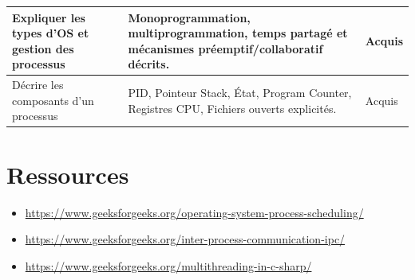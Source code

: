 \begin{center}
\begin{tabular}{|p{}|p{}|m{}|}
Expliquer les types d'OS et gestion des processus &
Monoprogrammation, multiprogrammation, temps partagé et mécanismes préemptif/collaboratif décrits. &
{\color{green!60!black}Acquis} \\ \hline

Décrire les composants d'un processus &
PID, Pointeur Stack, État, Program Counter, Registres CPU, Fichiers ouverts explicités. &
{\color{green!60!black}Acquis} \\ \hline

\end{tabular}
\end{center}

\section*{Ressources}

\begin{itemize}
	\item \url{https://www.geeksforgeeks.org/operating-system-process-scheduling/}
	\item \url{https://www.geeksforgeeks.org/inter-process-communication-ipc/}
	\item \url{https://www.geeksforgeeks.org/multithreading-in-c-sharp/}
\end{itemize}
